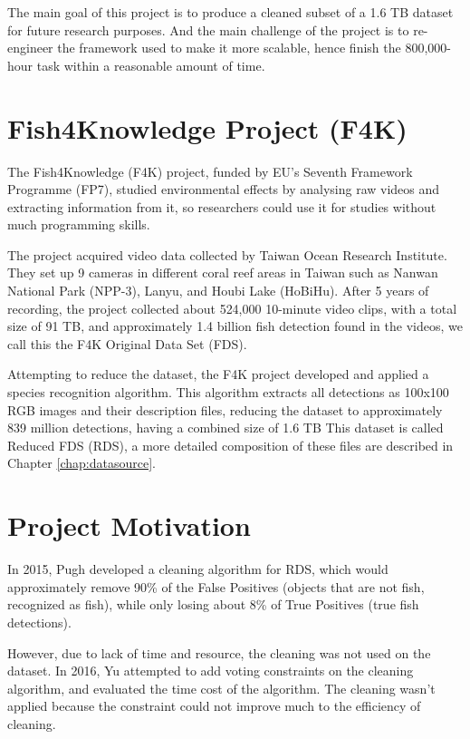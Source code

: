 \documentclass[bsc,logo,twoside,fullspacing,parskip]{infthesis}
\begin{document}

The main goal of this project is to produce a cleaned subset of a 1.6 TB dataset for future research purposes. And the main challenge of the project is to re-engineer the framework used to make it more scalable, hence finish the 800,000-hour task within a reasonable amount of time.

\section{Fish4Knowledge Project (F4K)}

The Fish4Knowledge (F4K) project, funded by EU's Seventh Framework Programme (FP7), studied environmental effects by analysing raw videos and extracting information from it, so researchers could use it for studies without much programming skills. 

The project acquired video data collected by Taiwan Ocean Research Institute. 
They set up 9 cameras in different coral reef areas in Taiwan such as Nanwan National Park (NPP-3), Lanyu, and Houbi Lake (HoBiHu). 
After 5 years of recording, the project collected about 524,000 10-minute video clips, with a total size of 91 TB, and approximately 1.4 billion fish detection found in the videos, we call this the F4K Original Data Set (FDS).

Attempting to reduce the dataset, the F4K project developed and applied a species recognition algorithm. 
This algorithm extracts all detections as 100x100 RGB images and their description files, reducing the dataset to approximately 839 million detections, having a combined size of 1.6 TB
This dataset is called Reduced FDS (RDS), a more detailed composition of these files are described in Chapter \ref{chap:datasource}.

\section{Project Motivation}

In 2015, Pugh\cite{P1} developed a cleaning algorithm for RDS, which would approximately remove 90\% of the False Positives (objects that are not fish, recognized as fish), while only losing about 8\% of True Positives (true fish detections). 

However, due to lack of time and resource, the cleaning was not used on the dataset.
In 2016, Yu\cite{P3} attempted to add voting constraints on the cleaning algorithm, and evaluated the time cost of the algorithm.
The cleaning wasn't applied because the constraint could not improve much to the efficiency of cleaning.
\end{document}
